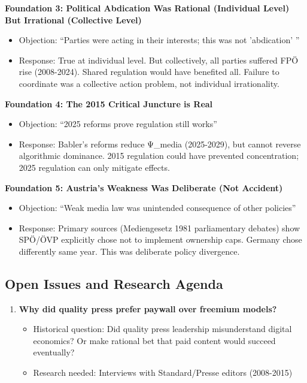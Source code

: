 {\textbf{Foundation 3: Political Abdication Was Rational (Individual Level) But Irrational (Collective Level)}
\begin{itemize}
\item Objection: ``Parties were acting in their interests; this was not 'abdication' ''
\item Response: True at individual level. But collectively, all parties suffered FPÖ rise (2008-2024).
  Shared regulation would have benefited all. Failure to coordinate was a collective action problem, not individual irrationality.
\end{itemize}

\textbf{Foundation 4: The 2015 Critical Juncture is Real}
\begin{itemize}
\item Objection: ``2025 reforms prove regulation still works''
\item Response: Babler's reforms reduce Ψ_media (2025-2029), but cannot reverse algorithmic dominance.
  2015 regulation could have prevented concentration; 2025 regulation can only mitigate effects.
\end{itemize}

\textbf{Foundation 5: Austria's Weakness Was Deliberate (Not Accident)}
\begin{itemize}
\item Objection: ``Weak media law was unintended consequence of other policies''
\item Response: Primary sources (Mediengesetz 1981 parliamentary debates) show SPÖ/ÖVP explicitly chose not to
  implement ownership caps. Germany chose differently same year. This was deliberate policy divergence.
\end{itemize}


\subsection*{Open Issues and Research Agenda}

\begin{enumerate}
\item \textbf{Why did quality press prefer paywall over freemium models?}
  \begin{itemize}
  \item Historical question: Did quality press leadership misunderstand digital economics?
    Or make rational bet that paid content would succeed eventually?
  \item Research needed: Interviews with Standard/Presse editors (2008-2015)
  \end{itemize}


\end{enumerate}}
